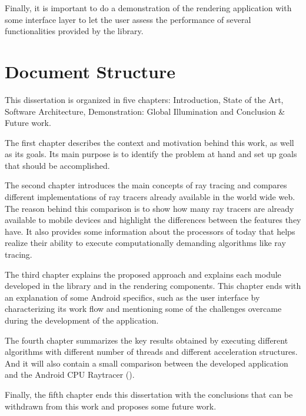 \par
Finally, it is important to do a demonstration of the rendering application with some interface layer to let the user assess the performance of several functionalities provided by the library.

\section{Document Structure}

\par
This dissertation is organized in five chapters: Introduction, State of the Art, Software Architecture, Demonstration: Global Illumination and Conclusion \& Future work.

\par
The first chapter describes the context and motivation behind this work, as well as its goals.
Its main purpose is to identify the problem at hand and set up goals that should be accomplished.

\par
The second chapter introduces the main concepts of ray tracing and compares different implementations of ray tracers already available in the world wide web.
The reason behind this comparison is to show how many ray tracers are already available to mobile devices and highlight the differences between the features they have.
It also provides some information about the processors of today that helps realize their ability to execute computationally demanding algorithms like ray tracing.

\par
The third chapter explains the proposed approach and explains each module developed in the library and in the rendering components.
This chapter ends with an explanation of some Android specifics, such as the user interface by characterizing its work flow and mentioning some of the challenges overcame during the development of the application.

\par
The fourth chapter summarizes the key results obtained by executing different algorithms with different number of threads and different acceleration structures.
And it will also contain a small comparison between the developed application and the Android CPU Raytracer (\cite{Android_CPU_Raytracer}).

\par
Finally, the fifth chapter ends this dissertation with the conclusions that can be withdrawn from this work and proposes some future work.